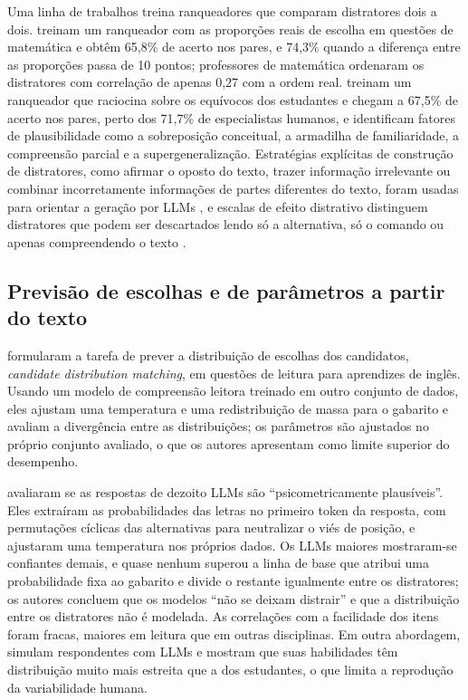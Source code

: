Uma linha de trabalhos treina ranqueadores que comparam distratores dois a dois. \citet{scarlatos2024} treinam um ranqueador com as proporções reais de escolha em questões de matemática e obtêm 65,8\% de acerto nos pares, e 74,3\% quando a diferença entre as proporções passa de 10 pontos; professores de matemática ordenaram os distratores com correlação de apenas 0,27 com a ordem real. \citet{lee2025} treinam um ranqueador que raciocina sobre os equívocos dos estudantes e chegam a 67,5\% de acerto nos pares, perto dos 71,7\% de especialistas humanos, e identificam fatores de plausibilidade como a sobreposição conceitual, a armadilha de familiaridade, a compreensão parcial e a supergeneralização. Estratégias explícitas de construção de distratores, como afirmar o oposto do texto, trazer informação irrelevante ou combinar incorretamente informações de partes diferentes do texto, foram usadas para orientar a geração por LLMs \citep{nagai2025}, e escalas de efeito distrativo distinguem distratores que podem ser descartados lendo só a alternativa, só o comando ou apenas compreendendo o texto \citep{zhang2020}.

\subsection{Previsão de escolhas e de parâmetros a partir do texto}\label{sec:ref-previsao}

\citet{liusie2023} formularam a tarefa de prever a distribuição de escolhas dos candidatos, \textit{candidate distribution matching}, em questões de leitura para aprendizes de inglês. Usando um modelo de compreensão leitora treinado em outro conjunto de dados, eles ajustam uma temperatura e uma redistribuição de massa para o gabarito e avaliam a divergência entre as distribuições; os parâmetros são ajustados no próprio conjunto avaliado, o que os autores apresentam como limite superior do desempenho.

\citet{saeuberli2025} avaliaram se as respostas de dezoito LLMs são ``psicometricamente plausíveis''. Eles extraíram as probabilidades das letras no primeiro token da resposta, com permutações cíclicas das alternativas para neutralizar o viés de posição, e ajustaram uma temperatura nos próprios dados. Os LLMs maiores mostraram-se confiantes demais, e quase nenhum superou a linha de base que atribui uma probabilidade fixa ao gabarito e divide o restante igualmente entre os distratores; os autores concluem que os modelos ``não se deixam distrair'' e que a distribuição entre os distratores não é modelada. As correlações com a facilidade dos itens foram fracas, maiores em leitura que em outras disciplinas. Em outra abordagem, \citet{liu2025} simulam respondentes com LLMs e mostram que suas habilidades têm distribuição muito mais estreita que a dos estudantes, o que limita a reprodução da variabilidade humana.

